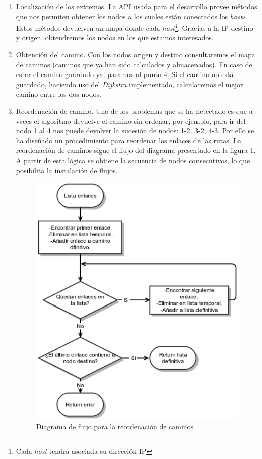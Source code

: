 \documentclass[a4paper,11pt]{book}
\begin{document}
\begin{enumerate}
\item Localización de los extremos.
La \ac{API} usada para el desarrollo provee métodos que nos permiten obtener los nodos a los cuales están conectados los \textit{hosts}. Estos métodos devuelven un mapa donde cada \textit{host\footnote{Cada \emph{host} tendrá asociada su dirección \ac{IP}}}. Gracias a la \ac{IP} destino y origen, obtendremos los nodos en los que estamos interesados.

\item Obtención del camino. Con los nodos origen y destino consultaremos el mapa de caminos (caminos que ya han sido calculados y almacenados). En caso de estar el camino guardado ya, pasamos al punto 4. Si el camino no está guardado, haciendo uso del \textit{Dijkstra} implementado, calcularemos el mejor camino entre los dos nodos.

\item Reordenación de camino. Uno de los problemas que se ha detectado es que a veces el algoritmo devuelve el camino sin ordenar, por ejemplo, para ir del nodo 1 al 4 nos puede devolver la sucesión de nodos: 1-2, 3-2, 4-3. Por ello se ha diseñado un procedimiento para reordenar los enlaces de las rutas.  La reordenación de caminos sigue el flujo del diagrama presentado en la figura \ref{reordenating}. A partir de esta lógica se obtiene la secuencia de nodos consecutivos, lo que posibilita la instalación de flujos. 

\begin{figure}[tb]
\centering
\includegraphics[scale=0.7]{./figuras/reordenating}
\caption{Diagrama de flujo para la reordenación de caminos.}
\label{reordenating}
\end{figure}


\end{enumerate}
\end{document}
